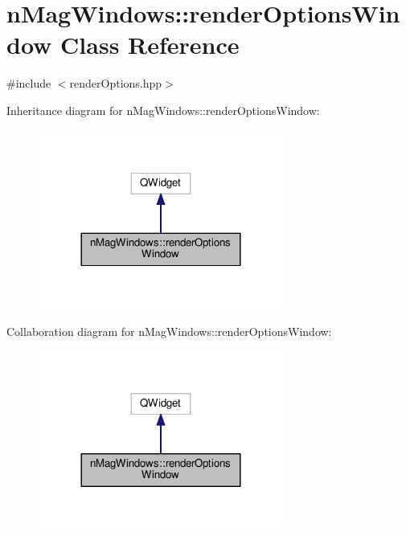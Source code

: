 \hypertarget{classnMagWindows_1_1renderOptionsWindow}{}\section{n\+Mag\+Windows\+:\+:render\+Options\+Window Class Reference}
\label{classnMagWindows_1_1renderOptionsWindow}


{\ttfamily \#include $<$render\+Options.\+hpp$>$}



Inheritance diagram for n\+Mag\+Windows\+:\+:render\+Options\+Window\+:\nopagebreak
\begin{figure}[H]
\begin{center}
\leavevmode
\includegraphics[width=228pt]{d1/d6c/classnMagWindows_1_1renderOptionsWindow__inherit__graph}
\end{center}
\end{figure}


Collaboration diagram for n\+Mag\+Windows\+:\+:render\+Options\+Window\+:\nopagebreak
\begin{figure}[H]
\begin{center}
\leavevmode
\includegraphics[width=228pt]{d4/da3/classnMagWindows_1_1renderOptionsWindow__coll__graph}
\end{center}
\end{figure}
